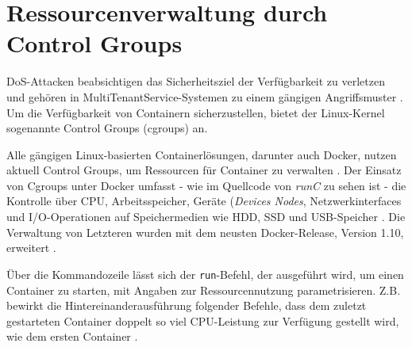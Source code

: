 \documentclass[../main.tex]{subfiles}
\begin{document}



	\section{Ressourcenverwaltung durch Control Groups}
  \label{secCgroups}
		\acrshort{DoS}-Attacken beabsichtigen das Sicherheitsziel der Verfügbarkeit zu verletzen und gehören in \gls{MultiTenantService}-Systemen zu einem gängigen Angriffsmuster \cite[S.5]{dockerSec1}. Um die Verfügbarkeit von Containern sicherzustellen, bietet der Linux-Kernel sogenannte Control Groups (\acrshort{cgroups}) an.

		Alle gängigen Linux-basierten Containerlösungen, darunter auch Docker, nutzen aktuell Control Groups, um Ressourcen für Container zu verwalten \cite[S.16]{dockerSec2}. Der Einsatz von Cgroups unter Docker umfasst - wie im Quellcode von \emph{runC} zu sehen ist - die Kontrolle über \acrshort{CPU}, Arbeitsspeicher, Geräte (\emph{Devices Nodes}, Netzwerkinterfaces und \acrshort{I/O}-Operationen auf Speichermedien wie \acrshort{HDD}, \acrshort{SSD} und \acrshort{USB}-Speicher \cite{cgroupsRedhat}\cite{githubRunCCgroups}. Die Verwaltung von Letzteren wurden mit dem neusten Docker-Release, Version 1.10, erweitert \cite{docker110}.


		Über die Kommandozeile lässt sich der \texttt{run}-Befehl, der ausgeführt wird, um einen Container zu starten, mit Angaben zur Ressourcennutzung parametrisieren. Z.B. bewirkt die Hintereinanderausführung folgender Befehle, dass dem zuletzt gestarteten Container doppelt so viel CPU-Leistung zur Verfügung gestellt wird, wie dem ersten Container \cite{dockerRun}.
\end{document}
